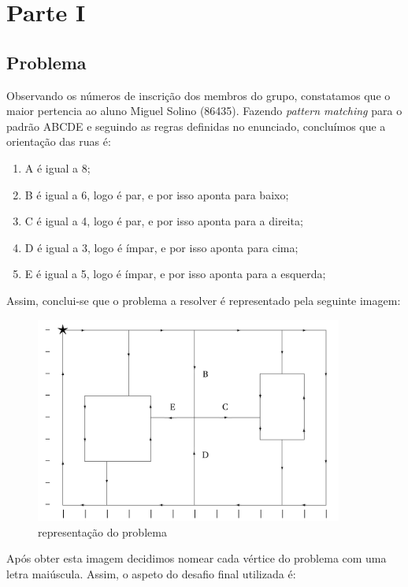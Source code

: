 \documentclass[a4paper]{report}
\begin{document}
\chapter{Parte I}
\section{Problema}
Observando os números de inscrição dos membros do grupo, constatamos
que o maior pertencia ao aluno Miguel Solino (86435).
Fazendo \textit{pattern matching} para o padrão ABCDE e seguindo as
regras definidas no enunciado, concluímos que a orientação das ruas é:

\begin{enumerate}
    \item A é igual a 8;
    \item B é igual a 6, logo é par, e por isso aponta para baixo;
    \item C é igual a 4, logo é par, e por isso aponta para a direita;
    \item D é igual a 3, logo é ímpar, e por isso aponta para cima;
    \item E é igual a 5, logo é ímpar, e por isso aponta para a 
        esquerda;
\end{enumerate}
Assim, conclui-se que o problema a resolver é representado pela
seguinte imagem:

\begin{figure}[H]
    \begin{center}
        \includegraphics[width=0.9\textwidth]{images/desafio.png}\par
        \caption{representação do problema}
        \label{fig:problem}
    \end{center}
\end{figure}
Após obter esta imagem decidimos nomear cada vértice do problema com
uma letra maiúscula. Assim, o aspeto do desafio final utilizada é:
\end{document}
